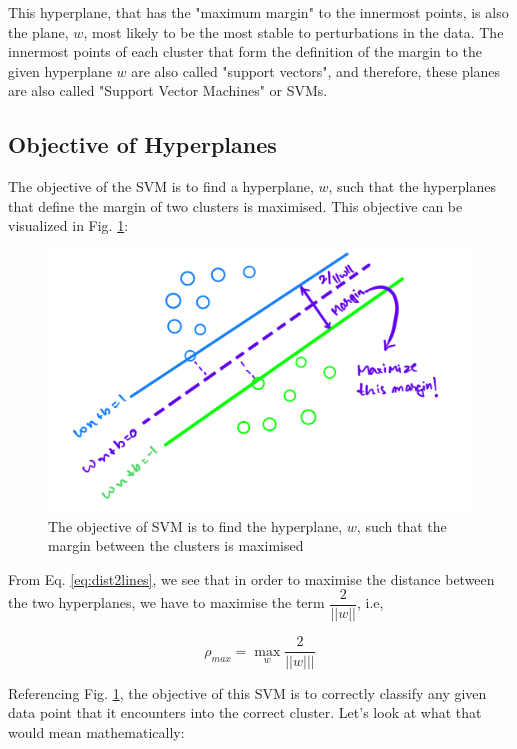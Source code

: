 \documentclass[11pt]{article}
\begin{document}
This hyperplane, that has the "maximum margin" to the innermost points, is also the plane, $w$, most likely to be the most stable to perturbations in the data. The innermost points of each cluster that form the definition of the margin to the given hyperplane $w$ are also called "support vectors", and therefore, these planes are also called "Support Vector Machines" or SVMs.

\subsection{Objective of Hyperplanes}

The objective of the SVM is to find a hyperplane, $w$, such that the hyperplanes that define the margin of two clusters is maximised. This objective can be visualized in Fig. \ref{fig:hyperPlaneMargin}:

\begin{figure}[h]
    \centering
    \includegraphics[scale=0.28]{figures/SVMIntro.PNG}
    \caption{The objective of SVM is to find the hyperplane, $w$, such that the margin between the clusters is maximised}
    \label{fig:hyperPlaneMargin}
\end{figure}

From Eq. \ref{eq:dist2lines}, we see that in order to maximise the distance between the two hyperplanes, we have to maximise the term $\dfrac{2}{||w||}$, i.e,

\begin{equation}
    \rho_{max} = \max_{w} \dfrac{2}{||w|||}
\end{equation}

Referencing Fig. \ref{fig:hyperPlaneMargin}, the objective of this SVM is to correctly classify any given data point that it encounters into the correct cluster. 
Let's look at what that would mean mathematically:
\end{document}
